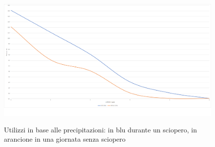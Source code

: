 \begin{figure}[H]                                                                                                                                                            
\centering                                                                                                                                                                   
\includegraphics[width=\textwidth]{images/result4}                                                                                                                                   
\label{fig:result4}
\caption{Utilizzi in base alle precipitazioni: in blu durante un sciopero, in arancione in una giornata senza sciopero}                                                                                                                                                           
\end{figure}



